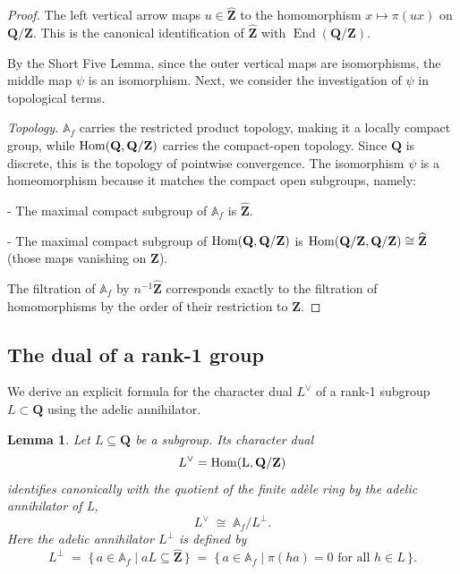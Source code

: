 \documentclass[11pt,a4paper]{article}
\newcommand{\Q}{\mathbf{Q}}
\newcommand{\Z}{\mathbf{Z}}
\newcommand{\A}{\mathbb{A}}
\newcommand{\Zhat}{\widehat{\Z}}
\def\Hom{\rm{Hom}}
\theoremstyle{plain}
\newtheorem{lem}[thm]{Lemma}
\theoremstyle{definition} %
\begin{document}
\begin{proof}
 The left vertical arrow maps $u \in \Zhat$ to the homomorphism $x \mapsto \pi(ux)$ on $\Q/\Z$. This is the canonical identification of $\Zhat$ with $\operatorname{End}(\Q/\Z)$.

By the Short Five Lemma, since the outer vertical maps are isomorphisms, the middle map $\psi$ is an isomorphism.
Next, we consider the investigation of $\psi$ in topological terms.\vspace{.02in}

\emph{Topology.}
$\A_f$ carries the restricted product topology, making it a locally compact group, while 
$\Hom(\Q, \Q/\Z)$ carries the compact-open topology. Since $\Q$ is discrete, this is the topology of pointwise convergence.
The isomorphism $\psi$ is a homeomorphism because it matches the compact open subgroups, namely:\vspace{.02in}

- The maximal compact subgroup of $\A_f$ is $\Zhat$.

- The maximal compact subgroup of $\Hom(\Q, \Q/\Z)$ is $\Hom(\Q/\Z, \Q/\Z) \cong \Zhat$ (those maps vanishing on $\Z$).

The filtration of $\A_f$ by $n^{-1}\Zhat$ corresponds exactly to the filtration of homomorphisms by the order of their restriction to $\Z$.
\end{proof}

\subsection{The dual of a rank-1 group}

We derive an explicit formula for the character dual $L^\vee$ of a rank-1 subgroup $L \subset \Q$ using the adelic annihilator.

\begin{lem}
Let $L \subseteq \mathbf{Q}$ be a subgroup. Its character dual
\[
L^{\vee} = \Hom(L,\mathbf{Q}/\mathbf{Z})
\]
identifies canonically with the quotient of the finite adèle ring by the adelic annihilator of L,
\[
L^{\vee} \;\cong\; \mathbb{A}_f / L^{\perp}.
\]
Here the adelic annihilator $L^{\perp}$ is defined by
 \[
 L^{\perp}
\;=\;
\{\, a \in \mathbb{A}_f \mid aL \subseteq \widehat{\mathbf{Z}} \,\}
\;=\;
\{\, a \in \mathbb{A}_f \mid \pi(ha)=0 \text{ for all } h\in L \,\}.
\]

\end{lem}
\end{document}
